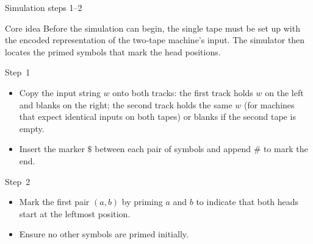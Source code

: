 \begin{frame}[t]{Simulation steps 1–2}
  \begin{tblock}{Core idea}
    Before the simulation can begin, the single tape must be set up
    with the encoded representation of the two‑tape machine’s input.
    The simulator then locates the primed symbols that mark the head
    positions.
  \end{tblock}
  \begin{tblock}{Step 1}
    \begin{itemize}
      \item Copy the input string $w$ onto both tracks: the first track
        holds $w$ on the left and blanks on the right; the second
        track holds the same $w$ (for machines that expect identical
        inputs on both tapes) or blanks if the second tape is empty.
      \item Insert the marker $\$$ between each pair of symbols and
        append $\#$ to mark the end.
    \end{itemize}
  \end{tblock}
  \begin{tblock}{Step 2}
    \begin{itemize}
      \item Mark the first pair $(a,b)$ by priming $a$ and $b$ to
        indicate that both heads start at the leftmost position.
      \item Ensure no other symbols are primed initially.
    \end{itemize}
  \end{tblock}
  \label{fr:7.5-05}
\end{frame}

